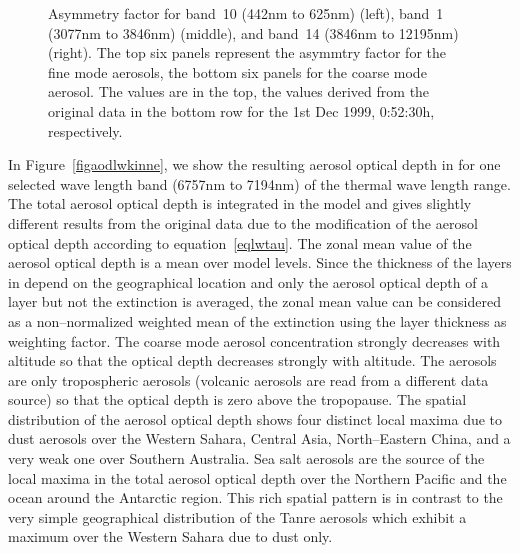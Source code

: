 \begin{appendix}
\begin{figure}[hp]
\pctsixt
{\vspace{-1.0cm}}
{\vspace{-1.0cm}\hspace{-3cm}}
{\vspace{-1.0cm}\hspace{-3cm}}
{}
{\hspace{-3cm}}
{\hspace{-3cm}}
\caption{Asymmetry factor for band~10 (442nm to 625nm) (left),
  band~1 (3077nm to 3846nm) (middle), and band~14 (3846nm to 12195nm)
  (right). The top six panels represent the asymmtry factor for the
  fine mode aerosols, the bottom six panels for the coarse mode
  aerosol. The \echam{} values are in the top, the values derived from the
  original data in the bottom row for the 1st Dec 1999, 0:52:30h, respectively.}\label{figasysw}
\end{figure}

In Figure~\ref{figaodlwkinne}, we show the resulting aerosol optical
depth in \echam{} for one selected wave length band (6757nm to 7194nm) of
the thermal wave length range. The total aerosol optical depth is
integrated in the model and gives slightly different results from the
original data due to the modification of the aerosol optical depth
according to equation~\ref{eqlwtau}. The zonal mean value of the
aerosol optical depth is a mean over model levels. Since the thickness
of the layers in \echam{} depend on the geographical location and only
the aerosol optical depth of a layer but not the extinction is
averaged, the zonal mean value can be considered as a non--normalized
weighted mean of the extinction using the layer thickness as weighting
factor. The coarse mode aerosol concentration strongly decreases with
altitude so that the optical depth decreases strongly with
altitude. The aerosols are only tropospheric aerosols (volcanic
aerosols are read from a different data source) so that the optical
depth is zero above the tropopause. The spatial distribution of the
aerosol optical depth shows four distinct local maxima due to
dust aerosols over the Western Sahara, Central Asia,
North--Eastern China, and a very weak one over Southern Australia. Sea
salt aerosols are the source of the local maxima in the total aerosol
optical depth over the Northern Pacific and the ocean around the
Antarctic region. This rich spatial pattern is in contrast to the very
simple geographical distribution of the Tanre aerosols which exhibit a
maximum over the Western Sahara due to dust only.


\end{appendix}
